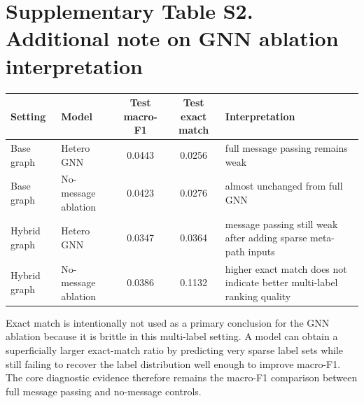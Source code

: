 \documentclass[11pt]{article}
\begin{document}
\section*{Supplementary Table S2. Additional note on GNN ablation interpretation}
\begin{table}[h!]
\centering
\begin{tabularx}{\textwidth}{>{\raggedright\arraybackslash}p{2.0cm}>{\raggedright\arraybackslash}p{2.3cm}ccX}
\toprule
Setting & Model & Test macro-F1 & Test exact match & Interpretation \\
\midrule
Base graph & Hetero GNN & 0.0443 & 0.0256 & full message passing remains weak \\
Base graph & No-message ablation & 0.0423 & 0.0276 & almost unchanged from full GNN \\
Hybrid graph & Hetero GNN & 0.0347 & 0.0364 & message passing still weak after adding sparse meta-path inputs \\
Hybrid graph & No-message ablation & 0.0386 & 0.1132 & higher exact match does not indicate better multi-label ranking quality \\
\bottomrule
\end{tabularx}
\end{table}
Exact match is intentionally not used as a primary conclusion for the GNN ablation because it is brittle in this multi-label setting. A model can obtain a superficially larger exact-match ratio by predicting very sparse label sets while still failing to recover the label distribution well enough to improve macro-F1. The core diagnostic evidence therefore remains the macro-F1 comparison between full message passing and no-message controls.
\end{document}
